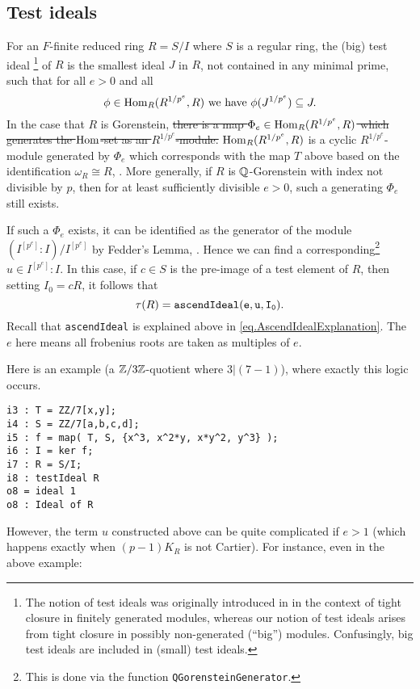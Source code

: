 \documentclass{amsart}
\begin{document}
\subsection{Test ideals}

For an $F$-finite reduced ring $R = S/I$ where $S$ is a regular ring, the (big) test ideal
\footnote{The notion of test ideals was originally introduced in \cite{HochsterHunekeTC1} in the context of tight closure in finitely generated modules, whereas our notion of test ideals arises from
tight closure in possibly non-generated (``big'') modules. Confusingly, big test ideals are included in (small) test ideals.}
of $R$ is the smallest ideal $J$ in $R$, not contained in any minimal prime, such that for all $e > 0$ and all
\[
\phi \in \operatorname{Hom}_R(R^{1/p^e}, R) \text{ we have } \phi(J^{1/p^e}) \subseteq J.
\]
In the case that $R$ is Gorenstein, 
\sout{there is a map $\Phi_e \in \operatorname{Hom}_R(R^{1/p^e}, R)$ which generates the $\operatorname{Hom}$-set as an $R^{1/p^e}$-module.  }
$\operatorname{Hom}_R(R^{1/p^e}, R)$ is a cyclic $R^{1/p^e}$-module generated by 
$\Phi_e$ which corresponds with the map $T$ above based on the identification 
$\omega_R \cong R$, \cite{BlickleSchwedeSurveyPMinusE}.  More generally, if $R$ is $\mathbb{Q}$-Gorenstein with index not divisible by $p$, then for at least sufficiently divisible $e > 0$, such a generating $\Phi_e$ still exists.

If such a $\Phi_e$ exists, it can be identified as the generator of the module $(I^{[p^e]} : I) / I^{[p^e]}$ by Fedder's Lemma, \cite{FedderFPureRat}.  Hence we can find a corresponding\footnote{This is done via the function \texttt{QGorensteinGenerator}. } $u \in I^{[p^e]} : I$.  In this case, if $c \in S$ is the pre-image of a test element of $R$, then setting $I_0 = cR$, it follows that
\[
\tau(R) = {\tt ascendIdeal(e, u, I_0)}.
\]
Recall that \texttt{ascendIdeal} is explained above in \autoref{eq.AscendIdealExplanation}.  The $e$ here means all frobenius roots are taken as multiples of $e$.  

Here is an example (a $\mathbb{Z}/3\mathbb{Z}$-quotient where $3 | (7-1)$), where exactly this logic occurs.

\medskip
\begin{verbatim}
i3 : T = ZZ/7[x,y];
i4 : S = ZZ/7[a,b,c,d];
i5 : f = map( T, S, {x^3, x^2*y, x*y^2, y^3} );
i6 : I = ker f;
i7 : R = S/I;
i8 : testIdeal R
o8 = ideal 1
o8 : Ideal of R
\end{verbatim}
\medskip

However, the term $u$ constructed above can be quite complicated if $e > 1$ (which happens exactly when $(p -1)K_R$ is not Cartier).  For instance, even in the above example:
\end{document}
